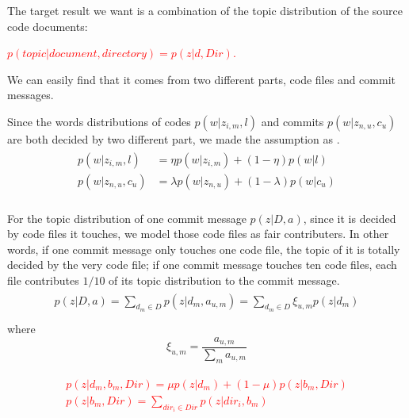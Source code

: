 The target result we want is a combination of the topic distribution of the 
source code documents:

\textcolor{red}{$p(topic|document, directory)=p(z|d, Dir)$.}

We can easily find that it comes from two different parts, code files
and commit messages.

Since the words distributions of codes $p(w|z_{i,m},l)$ and commits $p(w|z_{n,u},c_u)$ 
are both decided by two different part, we made the assumption as . 
\begin{align}
\label{equ:split}
\begin{split}
p(w|z_{i,m},l)&=\eta p(w|z_{i,m})+(1-\eta) p(w|l)\\
p(w|z_{n,u},c_u)&=\lambda p(w|z_{n,u})+(1-\lambda) p(w|c_u)\\
\end{split}					
\end{align}

For the topic distribution of one commit message $p(z|D,a)$, since it is decided by 
code files it touches, we model those code files as fair contributers. In other words,
if one commit message only touches one code file, the topic of it is totally decided
by the very code file; if one commit message touches ten code files, each file contributes
$1/10$ of its topic distribution to the commit message.
\begin{align} 
\begin{split}
p(z|D,a)=\sum _{d_m \in D }{ p(z|d_m,a_{u,m})}=\sum _{d_m \in D }\xi_{u,m} {p(z|d_m)}\\
\end{split}					
\end{align}
where 
\[\xi_{u,m}=\frac{a_{u,m}}{\sum _{m}{a_{u,m}}}\]

\textcolor{red}{
\begin{align} 
\begin{split}
p(z|d_m,b_m,Dir) = \mu p(z|d_m) + (1-\mu) p(z|b_m,Dir)\\
p(z|b_m,Dir) = \sum _{dir_i \in Dir}{p(z|dir_i,b_m)}\\
\end{split}					
\end{align}
}



